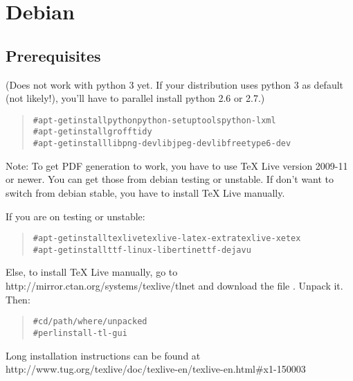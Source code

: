 \documentclass[a5paper]{book}
\begin{document}
\begin{german}
%
\label{debian}%
\hypertarget{debian}{}%
%
\section*{Debian}


%
\label{id4}%
\hypertarget{id4}{}%
%
\subsection*{Prerequisites}


(Does not work with python 3 yet. If your distribution uses python 3 as
default (not likely!), you’ll have to parallel install python 2.6 or 2.7.)\par

\begin{quote}
\begin{alltt}
\# apt-get install python python-setuptools python-lxml
\# apt-get install groff tidy
\# apt-get install libpng-dev libjpeg-dev libfreetype6-dev
\end{alltt}
\end{quote}

Note: To get PDF generation to work, you have to use TeX Live version
2009-11 or newer. You can get those from debian testing or
unstable. If don’t want to switch from debian stable, you have to
install TeX Live manually.\par

If you are on testing or unstable:\par

\begin{quote}
\begin{alltt}
\# apt-get install texlive texlive-latex-extra texlive-xetex
\# apt-get install ttf-linux-libertine ttf-dejavu
\end{alltt}
\end{quote}

Else, to install TeX Live manually, go to
{http://mirror.ctan.org/systems/texlive/tlnet} and download the file
{}. Unpack it. Then:\par

\begin{quote}
\begin{alltt}
\# cd /path/where/unpacked
\# perl install-tl -gui
\end{alltt}
\end{quote}

Long installation instructions can be found at
{http://www.tug.org/texlive/doc/texlive-en/texlive-en.html\#x1-150003}\par


\end{german}
\end{document}
